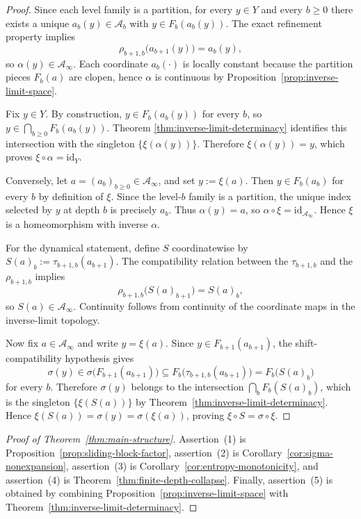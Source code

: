 \begin{proof}
Since each level family is a partition, for every \(y\in Y\) and every
\(b\geq 0\) there exists a unique \(a_b(y)\in\mathcal{A}_b\) with
\(y\in F_b(a_b(y))\).  The exact refinement property implies
\[
  \rho_{b+1,b}\bigl(a_{b+1}(y)\bigr)=a_b(y),
\]
so \(\alpha(y)\in\mathcal{A}_\infty\).  Each coordinate \(a_b(\cdot)\) is
locally constant because the partition pieces \(F_b(a)\) are clopen,
hence \(\alpha\) is continuous by Proposition~\ref{prop:inverse-limit-space}.

Fix \(y\in Y\).  By construction, \(y\in F_b(a_b(y))\) for every \(b\),
so \(y\in \bigcap_{b\geq 0}F_b(a_b(y))\).  Theorem
\ref{thm:inverse-limit-determinacy} identifies this intersection with the
singleton \(\{\xi(\alpha(y))\}\).  Therefore \(\xi(\alpha(y))=y\), which
proves \(\xi\circ\alpha=\mathrm{id}_Y\).

Conversely, let \(a=(a_b)_{b\geq 0}\in\mathcal{A}_\infty\), and set
\(y:=\xi(a)\).  Then \(y\in F_b(a_b)\) for every \(b\) by definition of
\(\xi\).  Since the level-\(b\) family is a partition, the unique index
selected by \(y\) at depth \(b\) is precisely \(a_b\).  Thus
\(\alpha(y)=a\), so \(\alpha\circ\xi=\mathrm{id}_{\mathcal{A}_\infty}\).
Hence \(\xi\) is a homeomorphism with inverse \(\alpha\).

For the dynamical statement, define \(S\) coordinatewise by
\(S(a)_b:=\tau_{b+1,b}(a_{b+1})\).  The compatibility relation between
the \(\tau_{b+1,b}\) and the \(\rho_{b+1,b}\) implies
\[
  \rho_{b+1,b}\bigl(S(a)_{b+1}\bigr)=S(a)_b,
\]
so \(S(a)\in\mathcal{A}_\infty\).  Continuity follows from continuity of
the coordinate maps in the inverse-limit topology.

Now fix \(a\in\mathcal{A}_\infty\) and write \(y=\xi(a)\).  Since
\(y\in F_{b+1}(a_{b+1})\), the shift-compatibility hypothesis gives
\[
  \sigma(y)\in
  \sigma\bigl(F_{b+1}(a_{b+1})\bigr)
  \subseteq F_b\bigl(\tau_{b+1,b}(a_{b+1})\bigr)
  = F_b\bigl(S(a)_b\bigr)
\]
for every \(b\).  Therefore \(\sigma(y)\) belongs to the intersection
\(\bigcap_b F_b(S(a)_b)\), which is the singleton \(\{\xi(S(a))\}\) by
Theorem~\ref{thm:inverse-limit-determinacy}.  Hence
\(\xi(S(a))=\sigma(y)=\sigma(\xi(a))\), proving
\(\xi\circ S=\sigma\circ\xi\).
\end{proof}

\begin{proof}[Proof of Theorem~\ref{thm:main-structure}]
Assertion~(1) is Proposition~\ref{prop:sliding-block-factor},
assertion~(2) is Corollary~\ref{cor:sigma-nonexpansion},
assertion~(3) is Corollary~\ref{cor:entropy-monotonicity}, and
assertion~(4) is Theorem~\ref{thm:finite-depth-collapse}.  Finally,
assertion~(5) is obtained by combining
Proposition~\ref{prop:inverse-limit-space} with
Theorem~\ref{thm:inverse-limit-determinacy}.
\end{proof}
